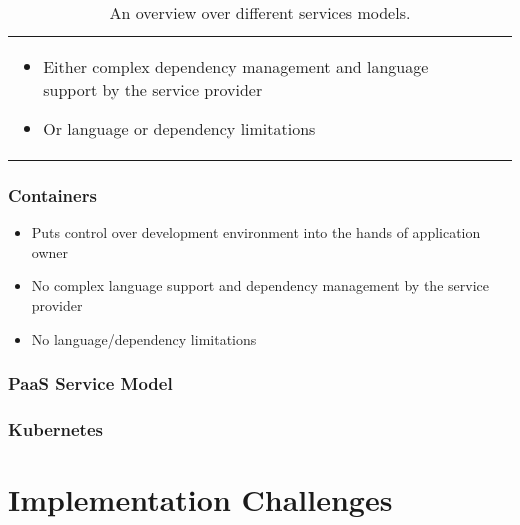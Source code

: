 \begin{table}
\begin{tabular}{L{75pt}|L{100pt}L{100pt}L{100pt}}
\begin{itemize}
      \item Either complex dependency management
            and language support by the service provider
      \item Or language or dependency limitations
    \end{itemize}                                                                                                                                                              \\
  \end{tabular}
  \caption{An overview over different services models.}
  \label{table:service-models}
\end{table}

\subsubsection*{Containers}

\begin{itemize}
  \item Puts control over development environment into the hands of application
        owner
  \item No complex language support and dependency management by the service provider
  \item No language/dependency limitations
\end{itemize}

\subsubsection*{PaaS Service Model}


\subsubsection*{Kubernetes}


\section{Implementation Challenges}
